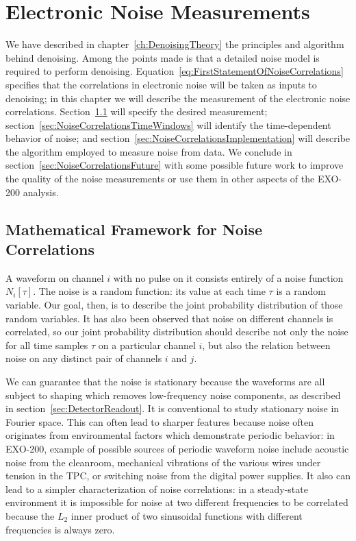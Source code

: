 
\renewcommand{\thechapter}{4}
\chapter{Electronic Noise Measurements}
\label{ch:NoiseMeasurements}

We have described in chapter~\ref{ch:DenoisingTheory} the principles and algorithm behind denoising.  Among the points made is that a detailed noise model is required to perform denoising.  Equation~\ref{eq:FirstStatementOfNoiseCorrelations} specifies that the correlations in electronic noise will be taken as inputs to denoising; in this chapter we will describe the measurement of the electronic noise correlations.  Section~\ref{sec:NoiseCorrelationsMath} will specify the desired measurement; section~\ref{sec:NoiseCorrelationsTimeWindows} will identify the time-dependent behavior of noise; and section~\ref{sec:NoiseCorrelationsImplementation} will describe the algorithm employed to measure noise from data.  We conclude in section~\ref{sec:NoiseCorrelationsFuture} with some possible future work to improve the quality of the noise measurements or use them in other aspects of the EXO-200 analysis.

\section{Mathematical Framework for Noise Correlations}\label{sec:NoiseCorrelationsMath}

A waveform on channel $i$ with no pulse on it consists entirely of a noise function $N_i[\tau]$.  The noise is a random function:  its value at each time $\tau$ is a random variable.  Our goal, then, is to describe the joint probability distribution of those random variables.  It has also been observed that noise on different channels is correlated, so our joint probability distribution should describe not only the noise for all time samples $\tau$ on a particular channel $i$, but also the relation between noise on any distinct pair of channels $i$ and $j$.

We can guarantee that the noise is stationary because the waveforms are all subject to shaping which removes low-frequency noise components, as described in section~\ref{sec:DetectorReadout}.  It is conventional to study stationary noise in Fourier space.  This can often lead to sharper features because noise often originates from environmental factors which demonstrate periodic behavior: in EXO-200, example of possible sources of periodic waveform noise include acoustic noise from the cleanroom, mechanical vibrations of the various wires under tension in the TPC, or switching noise from the digital power supplies.  It also can lead to a simpler characterization of noise correlations: in a steady-state environment it is impossible for noise at two different frequencies to be correlated because the $L_2$ inner product of two sinusoidal functions with different frequencies is always zero.

